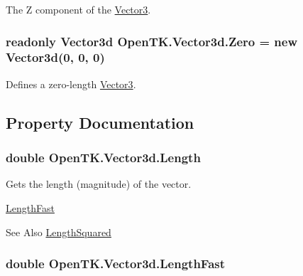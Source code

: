 The Z component of the \hyperlink{struct_open_t_k_1_1_vector3}{Vector3}. 

\hypertarget{struct_open_t_k_1_1_vector3d_ab7ac2adf76ddd6450d2a1e10ca2e22c1}{
\subsubsection[{Zero}]{\setlength{\rightskip}{0pt plus 5cm}readonly {\bf Vector3d} Open\-T\-K.\-Vector3d.\-Zero = new {\bf Vector3d}(0, 0, 0)\hspace{0.3cm}{\ttfamily [static]}}}\label{struct_open_t_k_1_1_vector3d_ab7ac2adf76ddd6450d2a1e10ca2e22c1}


Defines a zero-\/length \hyperlink{struct_open_t_k_1_1_vector3}{Vector3}. 



\subsection{Property Documentation}
\hypertarget{struct_open_t_k_1_1_vector3d_a554332540dcf9bac5720fdb26d5e96c2}{
\subsubsection[{Length}]{\setlength{\rightskip}{0pt plus 5cm}double Open\-T\-K.\-Vector3d.\-Length\hspace{0.3cm}{\ttfamily [get]}}}\label{struct_open_t_k_1_1_vector3d_a554332540dcf9bac5720fdb26d5e96c2}


Gets the length (magnitude) of the vector. 

\hyperlink{struct_open_t_k_1_1_vector3d_ae08ae4196dadb5dfb4baf0ab27b1ee57}{Length\-Fast} \begin{DoxySeeAlso}{See Also}
\hyperlink{struct_open_t_k_1_1_vector3d_aaad32d6807957c3db9e5d32f00571e70}{Length\-Squared}


\end{DoxySeeAlso}
\hypertarget{struct_open_t_k_1_1_vector3d_ae08ae4196dadb5dfb4baf0ab27b1ee57}{
\subsubsection[{Length\-Fast}]{\setlength{\rightskip}{0pt plus 5cm}double Open\-T\-K.\-Vector3d.\-Length\-Fast\hspace{0.3cm}{\ttfamily [get]}}}\label{struct_open_t_k_1_1_vector3d_ae08ae4196dadb5dfb4baf0ab27b1ee57}


